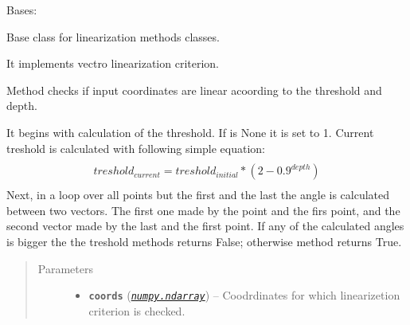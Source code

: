 \documentclass[a4paper,10pt,english]{sphinxmanual}
\begin{document}
\begin{fulllineitems}
\label{aqueduct.geom.traces:aqueduct.geom.traces.VectorLinearize}
Bases: \href{http://docs.python.org/2/library/functions.html\#object}{}

Base class for linearization methods classes.

It implements vectro linearization criterion.

\begin{fulllineitems}
\label{aqueduct.geom.traces:aqueduct.geom.traces.VectorLinearize.__init__}
\end{fulllineitems}


\begin{fulllineitems}
\label{aqueduct.geom.traces:aqueduct.geom.traces.VectorLinearize.is_linear_core}
Method checks if input coordinates are linear acoording to the threshold and depth.

It begins with calculation of the threshold. If  is None it is set to 1. Current treshold is calculated with following simple equation:
\begin{align*}\begin{aligned}
\begin{split}treshold_{current} = treshold_{initial} * (2 - 0.9^{depth})\end{split}\end{aligned}\end{align*}
Next, in a loop over all points but the first and the last the angle is calculated between two vectors. The first one made by the point and the firs point, and the second vector made by the last and the first point. If any of the calculated angles is bigger the the treshold methods returns False; otherwise method returns True.
\begin{quote}\begin{description}
\item[{Parameters}] \leavevmode\begin{itemize}
\item {} 
\textbf{\texttt{coords}} (\href{http://docs.scipy.org/doc/numpy/reference/generated/numpy.ndarray.html\#numpy.ndarray}{\emph{\texttt{numpy.ndarray}}}) -- Coodrdinates for which linearizetion criterion is checked.


\end{itemize}
\end{description}
\end{quote}
\end{fulllineitems}
\end{fulllineitems}
\end{document}
